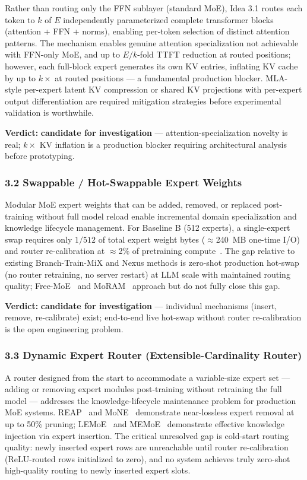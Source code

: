 \documentclass[11pt]{article}
\begin{document}
Rather than routing only the FFN sublayer (standard MoE), Idea 3.1 routes each token to $k$ of $E$ independently parameterized complete transformer blocks (attention + FFN + norms), enabling per-token selection of distinct attention patterns.
The mechanism enables genuine attention specialization not achievable with FFN-only MoE, and up to $E/k$-fold TTFT reduction at routed positions; however, each full-block expert generates its own KV entries, inflating KV cache by up to $k\times$ at routed positions --- a fundamental production blocker.
MLA-style per-expert latent KV compression or shared KV projections with per-expert output differentiation are required mitigation strategies before experimental validation is worthwhile.

\textbf{Verdict:} \textbf{candidate for investigation} --- attention-specialization novelty is real; $k\times$ KV inflation is a production blocker requiring architectural analysis before prototyping.

\subsubsection{3.2 Swappable / Hot-Swappable Expert Weights}
\label{sec:idea_3_2}

Modular MoE expert weights that can be added, removed, or replaced post-training without full model reload enable incremental domain specialization and knowledge lifecycle management.
For Baseline B (512 experts), a single-expert swap requires only $1/512$ of total expert weight bytes ($\approx$240~MB one-time I/O) and router re-calibration at $\approx$2\% of pretraining compute~\cite{Sukhbaatar2024Expert}.
The gap relative to existing Branch-Train-MiX and Nexus methods is zero-shot production hot-swap (no router retraining, no server restart) at LLM scale with maintained routing quality; Free-MoE~\cite{FreeMoE2025} and MoRAM~\cite{MoRAM2025} approach but do not fully close this gap.

\textbf{Verdict:} \textbf{candidate for investigation} --- individual mechanisms (insert, remove, re-calibrate) exist; end-to-end live hot-swap without router re-calibration is the open engineering problem.

\subsubsection{3.3 Dynamic Expert Router (Extensible-Cardinality Router)}
\label{sec:idea_3_3}

A router designed from the start to accommodate a variable-size expert set --- adding or removing expert modules post-training without retraining the full model --- addresses the knowledge-lifecycle maintenance problem for production MoE systems.
REAP~\cite{REAP2025} and MoNE~\cite{MoNE2025} demonstrate near-lossless expert removal at up to 50\% pruning; LEMoE~\cite{Wang2024LEMoE} and MEMoE~\cite{MEMoE2024} demonstrate effective knowledge injection via expert insertion.
The critical unresolved gap is cold-start routing quality: newly inserted expert rows are unreachable until router re-calibration (ReLU-routed rows initialized to zero), and no system achieves truly zero-shot high-quality routing to newly inserted expert slots.
\end{document}
